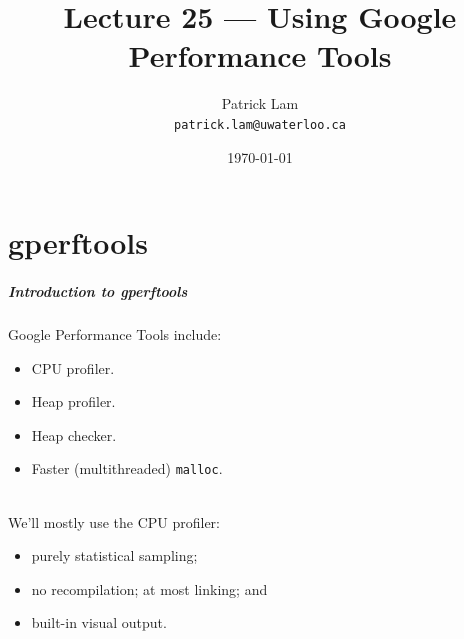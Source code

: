 

\title{Lecture 25 --- Using Google Performance Tools }

\author{Patrick Lam \\ \small \texttt{patrick.lam@uwaterloo.ca}}
\date{\today}




\begin{frame}
  \titlepage

 \end{frame}


\part{gperftools}
\frame{\partpage}

\begin{frame}
  \frametitle{Introduction to gperftools}

  
    Google Performance Tools include:
      
      \begin{itemize}
        \item CPU profiler.
        \item Heap profiler.
        \item Heap checker.
        \item Faster (multithreaded) {\tt malloc}.
      \end{itemize}
~\\[1em]
     We'll mostly use the CPU profiler:
      \begin{itemize}
        \item purely statistical sampling;
        \item no recompilation; at most linking; and
        \item built-in visual output.
      \end{itemize}
  
\end{frame}

